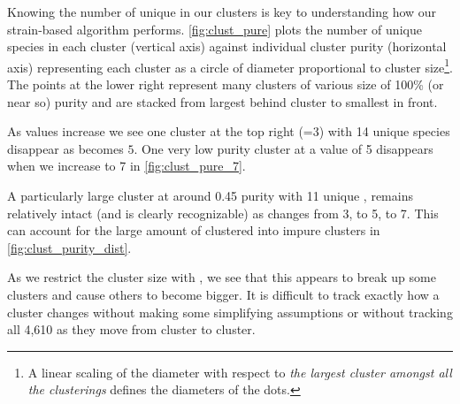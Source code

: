 Knowing the number of unique \spec{} in our clusters is key to understanding how our
strain-based \mst{} algorithm  performs.
\autoref{fig:clust_pure} plots the number of unique species in each cluster (vertical axis) against
individual cluster purity (horizontal axis) representing each cluster as a circle of diameter
proportional to cluster size\footnote{A linear scaling of the diameter with respect to \textit{the largest cluster amongst all the clusterings} defines the diameters of the dots.}.
The points at the lower right represent many clusters of various size of 100\% (or near so) purity and are stacked from largest behind cluster to smallest in front.

As \minneigh{} values increase  we see one cluster at the top right
(\minneigh{}=3) with 14 unique species disappear  as \minneigh{} becomes $5$.
One very low purity cluster at a \minneigh{} value of 5 disappears 
when we increase \minneigh{} to 7 in \autoref{fig:clust_pure_7}.

A particularly large cluster at around 0.45 purity with 11 unique \spec{}, remains relatively intact
(and is clearly recognizable)
as \minneigh{} changes from 3, to 5, to 7. 
This can account for the large amount of \isols{} clustered into impure clusters in \autoref{fig:clust_purity_dist}.

As we restrict the cluster size with \minneigh{}, we see that this appears to break up some clusters and cause others to become bigger.
It is difficult to track exactly how a cluster changes without making some simplifying assumptions or without tracking all 4,610 \isols{} as they move from cluster to cluster.

